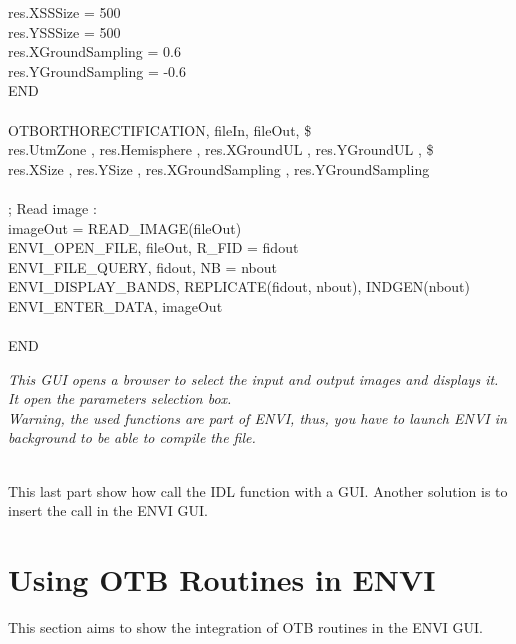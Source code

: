 \begin{scriptsize}
\indent res.XSSSize = 500\\
\indent res.YSSSize = 500\\
\indent res.XGroundSampling = 0.6\\
\indent res.YGroundSampling = -0.6\\
\indent END\\
\\
\indent OTBORTHORECTIFICATION, fileIn, fileOut, \$\\
\indent res.UtmZone , res.Hemisphere , res.XGroundUL , res.YGroundUL , \$\\
\indent res.XSize , res.YSize , res.XGroundSampling , res.YGroundSampling \\
\\
\indent ; Read image :\\
\indent imageOut = READ\_IMAGE(fileOut)\\
\indent ENVI\_OPEN\_FILE, fileOut, R\_FID = fidout\\
\indent ENVI\_FILE\_QUERY, fidout, NB = nbout\\
\indent ENVI\_DISPLAY\_BANDS, REPLICATE(fidout, nbout), INDGEN(nbout)\\
\indent ENVI\_ENTER\_DATA, imageOut\\
\\
\indent END

\indent \emph{This GUI opens a browser to select the input and output images and displays it. It open the parameters selection box.\\ \indent Warning, the used functions are part of ENVI, thus, you have to launch ENVI in background to be able to compile the file.}\\
\end{scriptsize}
\\
This last part show how call the IDL function with a GUI. Another solution is to insert the call in the ENVI GUI.


\section{Using OTB Routines in ENVI}
This section aims to show the integration of OTB routines in the ENVI GUI.

